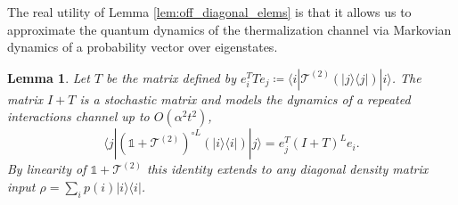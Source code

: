 \documentclass{article}
\newtheorem{lemma}[theorem]{Lemma}
\newcommand{\ket}[1]{|#1\rangle}
\newcommand{\bra}[1]{\langle #1|}
\newcommand{\ketbra}[2]{| #1\rangle\! \langle #2|}
\newcommand{\bigo}[1]{O\left( #1 \right)}
\newcommand{\identity}{\mathds{1}}
\begin{document}
The real utility of Lemma \ref{lem:off_diagonal_elems} is that it allows us to approximate the quantum dynamics of the thermalization channel via Markovian dynamics of a probability vector over eigenstates.
\begin{lemma} \label{lem:quantum_to_classical}
    Let $T$ be the matrix defined by $e_i^T T e_j \coloneqq \bra{i} \mathcal{T}^{(2)}(\ketbra{j}{j}) \ket{i}$. The matrix $I + T$ is a stochastic matrix and models the dynamics of a repeated interactions channel up to $\bigo{\alpha^2 t^2}$,
    \begin{equation}
        \bra{j} (\identity + \mathcal{T}^{(2)})^{\circ L} (\ketbra{i}{i}) \ket{j} = e_j^T (I + T)^L e_i.
    \end{equation}
    By linearity of $\identity + \mathcal{T}^{(2)}$ this identity extends to any diagonal density matrix input $\rho = \sum_i p(i) \ketbra{i}{i}$.
\end{lemma}
\end{document}

